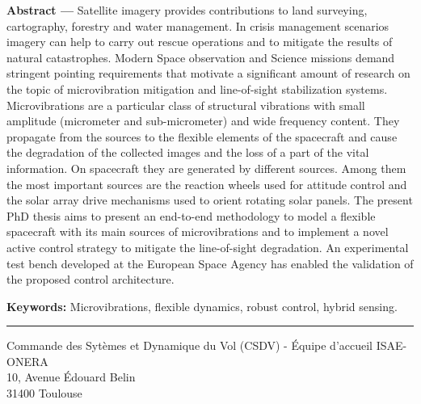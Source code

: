 \begin{vcenterpage}
{\large\textbf{Abstract ---}}  
Satellite imagery provides contributions to land surveying, cartography, forestry and water management. In crisis management scenarios imagery can help to carry out rescue operations and to mitigate the results of natural catastrophes.
Modern Space observation and Science missions demand stringent pointing requirements that motivate a significant amount of research on the topic of microvibration mitigation and line-of-sight stabilization systems. Microvibrations are a particular class of structural vibrations with small amplitude (micrometer and sub-micrometer) and wide frequency content. They propagate from the sources to the flexible elements of the spacecraft and cause the degradation of the collected images and the loss of a part of the vital information. On spacecraft they are generated by different sources. Among them the most important sources are the reaction wheels used for attitude control and the solar array drive mechanisms used to orient rotating solar panels.
The present PhD thesis aims to present an end-to-end methodology to model a flexible spacecraft with its main sources of microvibrations and to implement a novel active control strategy to mitigate the line-of-sight degradation. 
An experimental test bench developed at the European Space Agency has enabled the validation of the proposed control architecture.  

{\large\textbf{Keywords:}}
    Microvibrations, flexible dynamics, robust control, hybrid sensing.
\\
\noindent\rule[2pt]{\textwidth}{0.5pt}
\begin{center}
  Commande des Sytèmes et Dynamique du Vol (CSDV) - \'Equipe d'accueil ISAE-ONERA\\
 10, Avenue \'Edouard Belin\\
 31400 Toulouse
\end{center}
\end{vcenterpage}

